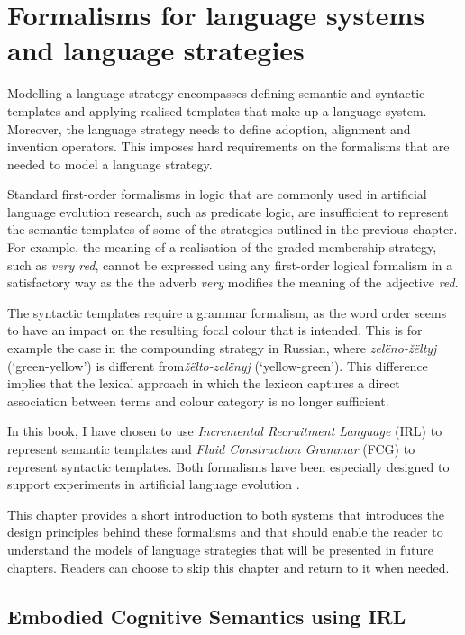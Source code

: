\chapter{Formalisms for language systems and language strategies}
\label{s:formalisms}

Modelling a language strategy encompasses defining semantic and
syntactic templates and applying realised templates that make up a
language system. Moreover, the language strategy needs to define
adoption, alignment and invention operators. This imposes hard
requirements on the formalisms that are needed to model a language
strategy.

Standard first-order formalisms in logic that are commonly used in
artificial language evolution research, such as predicate logic, are
insufficient to represent the semantic templates of some of the
strategies outlined in the previous chapter. For example, the meaning
of a realisation of the graded membership strategy, such as \textit{very
red}, cannot be expressed using any first-order logical formalism in
a satisfactory way as the the adverb \textit{very} modifies the meaning of
the adjective \textit{red}.

The syntactic templates require a grammar formalism, as the word order
seems to have an impact on the resulting focal colour that is
intended.  This is for example the case in the compounding strategy in
Russian, where \textit{zel\"eno-\v z\"eltyj} (`green-yellow') is different
from\textit{\v z\"elto-zel\"enyj} (`yellow-green'). This difference implies
that the lexical approach in which the lexicon captures a direct
association between terms and colour category is no longer sufficient.

In this book, I have chosen to use \emph{Incremental Recruitment
  Language} (IRL) to represent semantic templates and \emph{Fluid
  Construction Grammar} (FCG) to represent syntactic templates. Both
formalisms have been especially designed to support experiments in
artificial language evolution \citep{loetzsch09understanding}.

This chapter provides a short introduction to both systems that
introduces the design principles behind these formalisms and that
should enable the reader to understand the models of language
strategies that will be presented in future chapters. Readers can
choose to skip this chapter and return to it when needed.

\section{Embodied Cognitive Semantics using IRL}
\label{s:irl}

